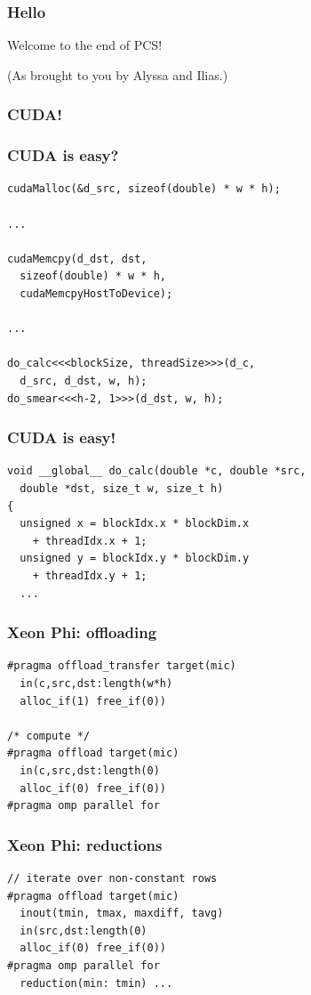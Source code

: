 \documentclass{beamer}
\begin{document}
\begin{frame}
 \frametitle{Hello}
 Welcome to the end of PCS!

 (As brought to you by Alyssa and Ilias.)
\end{frame}

\begin{frame}
 \frametitle{CUDA!}
\end{frame}

\begin{frame}[fragile]
 \frametitle{CUDA is easy?}
\begin{verbatim}
cudaMalloc(&d_src, sizeof(double) * w * h);

...

cudaMemcpy(d_dst, dst,
  sizeof(double) * w * h,
  cudaMemcpyHostToDevice);

...

do_calc<<<blockSize, threadSize>>>(d_c,
  d_src, d_dst, w, h);
do_smear<<<h-2, 1>>>(d_dst, w, h);
\end{verbatim}
\end{frame}

\begin{frame}[fragile]
 \frametitle{CUDA is easy!}
\begin{verbatim}
void __global__ do_calc(double *c, double *src,
  double *dst, size_t w, size_t h)
{
  unsigned x = blockIdx.x * blockDim.x
    + threadIdx.x + 1;
  unsigned y = blockIdx.y * blockDim.y
    + threadIdx.y + 1;
  ...
\end{verbatim}
\end{frame}

\begin{frame}[fragile]
 \frametitle{Xeon Phi: offloading}
\begin{verbatim}
#pragma offload_transfer target(mic)
  in(c,src,dst:length(w*h)
  alloc_if(1) free_if(0))

/* compute */
#pragma offload target(mic)
  in(c,src,dst:length(0)
  alloc_if(0) free_if(0))
#pragma omp parallel for
\end{verbatim}
\end{frame}

\begin{frame}[fragile]
 \frametitle{Xeon Phi: reductions}
\begin{verbatim}
// iterate over non-constant rows
#pragma offload target(mic)
  inout(tmin, tmax, maxdiff, tavg)
  in(src,dst:length(0)
  alloc_if(0) free_if(0))
#pragma omp parallel for
  reduction(min: tmin) ...

\end{verbatim}
\end{frame}
\end{document}

